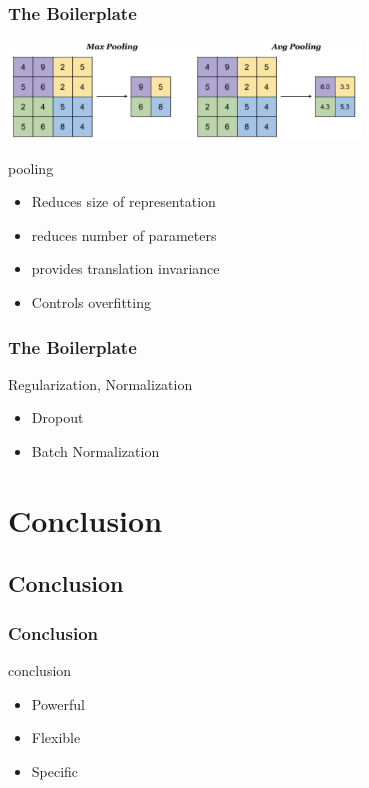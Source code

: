 \documentclass[aspectratio=169,usenames,dvipsnames]{beamer}
\begin{document}
\begin{frame}
    \frametitle{The Boilerplate}
    \centering
    \includegraphics[width=0.7\textwidth]{Figures/pool.png}
    \begin{block}{pooling}
        \begin{itemize}
            \item Reduces size of representation
            \item reduces number of parameters
            \item provides translation invariance
            \item Controls overfitting        
        \end{itemize}
    \end{block}
\end{frame}
\begin{frame}
    \frametitle{The Boilerplate}
    \begin{block}{Regularization, Normalization}
        \begin{itemize}
            \item Dropout
            \item Batch Normalization       
        \end{itemize}
    \end{block}
\end{frame}


\section{Conclusion}
\subsection{Conclusion}
\begin{frame}
    \frametitle{Conclusion}
    \begin{block}{conclusion}
        \begin{itemize}
            \item Powerful
            \item Flexible
            \item Specific      
        \end{itemize}    
    \end{block}
\end{frame}
\end{document}

